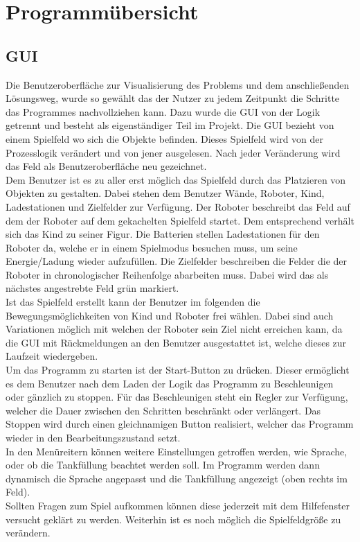 \section{Programmübersicht}
\subsection{GUI}

Die Benutzeroberfläche zur Visualisierung des Problems und dem anschließenden Lösungsweg, wurde so gewählt das der Nutzer zu jedem Zeitpunkt die Schritte das Programmes nachvollziehen kann. Dazu wurde die GUI von der Logik getrennt und besteht als eigenständiger Teil im Projekt. Die GUI bezieht von einem Spielfeld wo sich die Objekte befinden. Dieses Spielfeld wird von der Prozesslogik verändert und von jener ausgelesen. Nach jeder Veränderung wird das Feld als Benutzeroberfläche neu gezeichnet. \\
Dem Benutzer ist es zu aller erst möglich das Spielfeld durch das Platzieren von Objekten zu gestalten. Dabei stehen dem Benutzer Wände, Roboter, Kind, Ladestationen und Zielfelder zur Verfügung. Der Roboter beschreibt das Feld auf dem der Roboter auf dem gekachelten Spielfeld startet. Dem entsprechend verhält sich das Kind zu seiner Figur. Die Batterien stellen Ladestationen für den Roboter da, welche er in einem Spielmodus besuchen muss, um seine Energie/Ladung wieder aufzufüllen. Die Zielfelder beschreiben die Felder die der Roboter in chronologischer Reihenfolge abarbeiten muss. Dabei wird das als nächstes angestrebte Feld grün markiert. \\
Ist das Spielfeld erstellt kann der Benutzer im folgenden die Bewegungsmöglichkeiten von Kind und Roboter frei wählen. Dabei sind auch Variationen möglich mit welchen der Roboter sein Ziel nicht erreichen kann, da die GUI mit Rückmeldungen an den Benutzer ausgestattet ist, welche dieses zur Laufzeit wiedergeben. \\
Um das Programm zu starten ist der Start-Button zu drücken. Dieser ermöglicht es dem Benutzer nach dem Laden der Logik das Programm zu Beschleunigen oder gänzlich zu stoppen. Für das Beschleunigen steht ein Regler zur Verfügung, welcher die Dauer zwischen den Schritten beschränkt oder verlängert. Das Stoppen wird durch einen gleichnamigen Button realisiert, welcher das Programm wieder in den Bearbeitungszustand setzt. \\
In den Menüreitern können weitere Einstellungen getroffen werden, wie Sprache, oder ob die Tankfüllung beachtet werden soll. Im Programm werden dann dynamisch die Sprache angepasst und die Tankfüllung angezeigt (oben rechts im Feld). \\
Sollten Fragen zum Spiel aufkommen können diese jederzeit mit dem Hilfefenster versucht geklärt zu werden. Weiterhin ist es noch möglich die Spielfeldgröße zu verändern. \\
